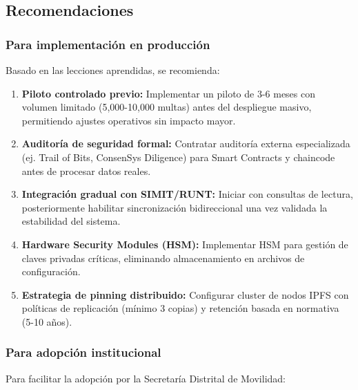 \subsection{Recomendaciones}

\subsubsection{Para implementación en producción}

Basado en las lecciones aprendidas, se recomienda:

\begin{enumerate}
    \item \textbf{Piloto controlado previo:} Implementar un piloto de 3-6 meses con volumen limitado (5,000-10,000 multas) antes del despliegue masivo, permitiendo ajustes operativos sin impacto mayor.
    
    \item \textbf{Auditoría de seguridad formal:} Contratar auditoría externa especializada (ej. Trail of Bits, ConsenSys Diligence) para Smart Contracts y chaincode antes de procesar datos reales.
    
    \item \textbf{Integración gradual con SIMIT/RUNT:} Iniciar con consultas de lectura, posteriormente habilitar sincronización bidireccional una vez validada la estabilidad del sistema.
    
    \item \textbf{Hardware Security Modules (HSM):} Implementar HSM para gestión de claves privadas críticas, eliminando almacenamiento en archivos de configuración.
    
    \item \textbf{Estrategia de pinning distribuido:} Configurar cluster de nodos IPFS con políticas de replicación (mínimo 3 copias) y retención basada en normativa (5-10 años).
\end{enumerate}

\subsubsection{Para adopción institucional}

Para facilitar la adopción por la Secretaría Distrital de Movilidad:

